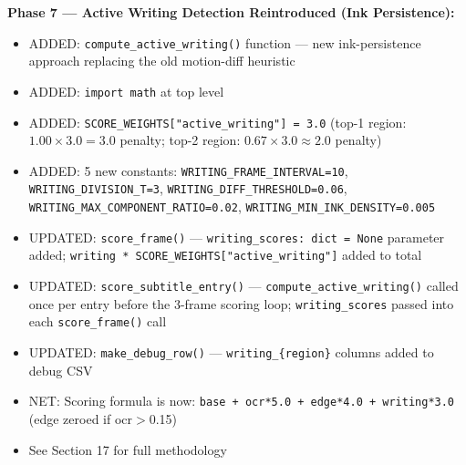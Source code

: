 \documentclass[11pt]{article}
\begin{document}
\textbf{Phase 7 --- Active Writing Detection Reintroduced (Ink Persistence):}
\begin{itemize}[leftmargin=1.2em]
    \item ADDED: \texttt{compute\_active\_writing()} function --- new ink-persistence approach replacing the old motion-diff heuristic
    \item ADDED: \texttt{import math} at top level
    \item ADDED: \texttt{SCORE\_WEIGHTS["active\_writing"] = 3.0} (top-1 region: $1.00 \times 3.0 = 3.0$ penalty; top-2 region: $0.67 \times 3.0 \approx 2.0$ penalty)
    \item ADDED: 5 new constants: \texttt{WRITING\_FRAME\_INTERVAL=10}, \texttt{WRITING\_DIVISION\_T=3}, \texttt{WRITING\_DIFF\_THRESHOLD=0.06}, \texttt{WRITING\_MAX\_COMPONENT\_RATIO=0.02}, \texttt{WRITING\_MIN\_INK\_DENSITY=0.005}
    \item UPDATED: \texttt{score\_frame()} --- \texttt{writing\_scores: dict = None} parameter added; \texttt{writing * SCORE\_WEIGHTS["active\_writing"]} added to total
    \item UPDATED: \texttt{score\_subtitle\_entry()} --- \texttt{compute\_active\_writing()} called once per entry before the 3-frame scoring loop; \texttt{writing\_scores} passed into each \texttt{score\_frame()} call
    \item UPDATED: \texttt{make\_debug\_row()} --- \texttt{writing\_\{region\}} columns added to debug CSV
    \item NET: Scoring formula is now: \texttt{base + ocr*5.0 + edge*4.0 + writing*3.0} (edge zeroed if ocr$>$0.15)
    \item See Section 17 for full methodology
\end{itemize}
\end{document}
